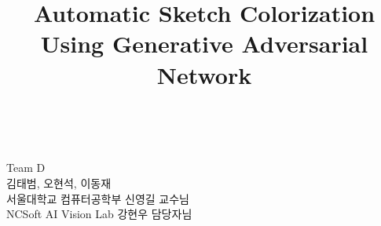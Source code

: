 \documentclass[11pt]{article}
\title{Automatic Sketch Colorization\\
	\Large Using Generative Adversarial Network}
\makeatletter
\let\thetitle\@title
\makeatother
\begin{document}

\begin{titlepage}
	\centering
	\vspace*{0.0cm}			%
	\textsc{ \Huge \bfseries \thetitle}\\
	\vspace*{12.0cm}
	
	\begin{minipage}{0.9\textwidth}
		\begin{flushright} \large
			Team D \\
			\vspace*{0.5em}
			김태범, 오현석, 이동재 \\
			\vspace*{0.5em}
			서울대학교 컴퓨터공학부 신영길 교수님\\
			\vspace*{0.5em}
			NCSoft AI Vision Lab 강현우 담당자님
		\end{flushright}
		
	\end{minipage}\\[2 cm]
\end{titlepage}


\pagebreak


\tableofcontents

\pagebreak














{\small


}
\end{document}
